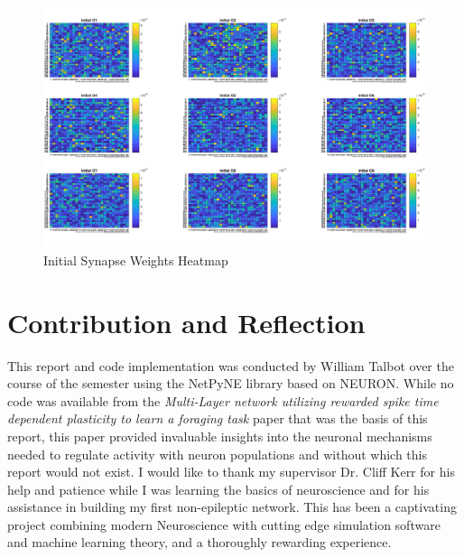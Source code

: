 \documentclass[11pt, twocolumn]{article}
\begin{document}
\begin{figure}[H]
	\centering
	\includegraphics[width=\linewidth]{initial_synapse_weights}
	\caption{Initial Synapse Weights Heatmap}
	\label{fig:initial_synapse_weights}
\end{figure}

\section*{Contribution and Reflection}
This report and code implementation was conducted by William Talbot over the course of the semester using the \acs{NetPyNE} library based on \acs{NEURON}. While no code was available from the \textit{Multi-Layer network utilizing rewarded spike time dependent plasticity to learn a foraging task} paper \cite{sanda2017multi} that was the basis of this report, this paper provided invaluable insights into the neuronal mechanisms needed to regulate activity with neuron populations and without which this report would not exist. I would like to thank my supervisor Dr. Cliff Kerr for his help and patience while I was learning the basics of neuroscience \cite{gerstner2014neuronal} and for his assistance in building my first non-epileptic network. This has been a captivating project combining modern Neuroscience with cutting edge simulation software and machine learning theory, and a thoroughly rewarding experience.
\end{document}

